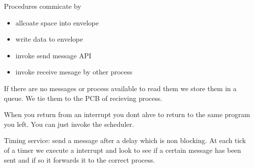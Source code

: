 \documentclass[12pt]{article}
\begin{document}
Procedures commicate by
\begin{itemize}
    \item allcoate space into envelope
    \item write data to envelope
    \item invoke send message API
    \item invoke receive mesage by other process
\end{itemize}
If there are no messages or process available to read them we store them in a queue. We tie them to the PCB of recieving process.

When you return from an interrupt you dont ahve to return to the same program you left. You can just invoke the scheduler.

Timing service: send a message after a delay which is non blocking. At each tick of a timer we execute a interrupt and look to see if a certain message has been sent and if so it forwards it to the correct process.
\end{document}
